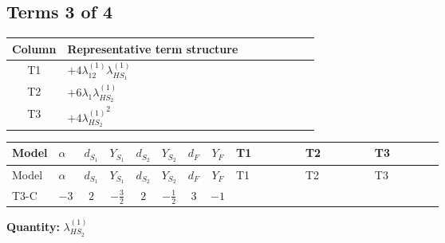 \documentclass[8pt]{article}
\begin{document}
\begin{landscape}
\subsection*{Terms 3 of 4}
\begin{center}
\begin{tabular}{@{}c >{\raggedright\arraybackslash}p{0.82\linewidth}@{}}
\toprule
Column & Representative term structure \\
\midrule
T1 & \(\displaystyle +4 {\lambda_{12}^{(1)}} {\lambda_{HS_1}^{(1)}}\) \\
\midrule
T2 & \(\displaystyle +6 {\lambda_1} {\lambda_{HS_2}^{(1)}}\) \\
\midrule
T3 & \(\displaystyle +4 {\lambda_{HS_2}^{(1)}}^2\) \\
\midrule
\bottomrule
\end{tabular}
\end{center}
\smallskip
\tiny
\begin{longtable}{@{}llcccccc >{\raggedright\arraybackslash}p{0.21\linewidth} >{\raggedright\arraybackslash}p{0.21\linewidth} >{\raggedright\arraybackslash}p{0.21\linewidth}@{}}
\toprule
Model & $\alpha$ & $d_{S_1}$ & $Y_{S_1}$ & $d_{S_2}$ & $Y_{S_2}$ & $d_F$ & $Y_F$ & T1 & T2 & T3 \\
\midrule
\endfirsthead
\toprule
Model & $\alpha$ & $d_{S_1}$ & $Y_{S_1}$ & $d_{S_2}$ & $Y_{S_2}$ & $d_F$ & $Y_F$ & T1 & T2 & T3 \\
\midrule
\endhead
T3-C & $-3$ & $2$ & $-\frac{3}{2}$ & $2$ & $-\frac{1}{2}$ & $3$ & $-1$ & \scriptsize\adjustbox{max width=\linewidth}{$\begin{gathered} +4 {\lambda_{12}^{(1)}} {\lambda_{HS_1}^{(1)}}\end{gathered}$} & \scriptsize\adjustbox{max width=\linewidth}{$\begin{gathered} +6 {\lambda_1} {\lambda_{HS_2}^{(1)}}\end{gathered}$} & \scriptsize\adjustbox{max width=\linewidth}{$\begin{gathered} +4 {\lambda_{HS_2}^{(1)}}^2\end{gathered}$} \\
\midrule
\bottomrule
\end{longtable}
\clearpage
\noindent\textbf{Quantity: }$\lambda_{HS_2}^{(1)}$\par\smallskip

\end{landscape}
\end{document}
